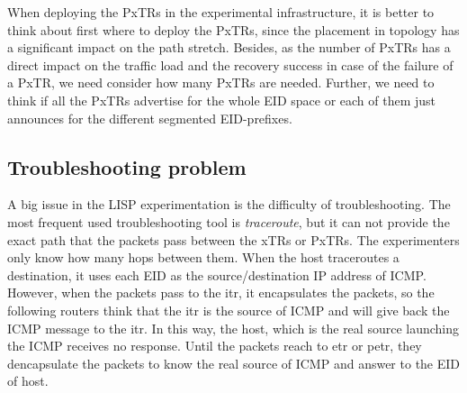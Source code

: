 When deploying the PxTRs in the experimental infrastructure, it is better to think about first where to deploy the PxTRs, since the placement in topology has a significant impact on the path stretch. Besides, as the number of PxTRs has a direct impact on the traffic load and the recovery success in case of the failure of a PxTR, we need consider how many PxTRs are needed. Further, we need to think if all the PxTRs advertise for the whole EID space or each of them just announces for the different segmented EID-prefixes.

\subsection{Troubleshooting problem}
\label{subsubsec:impact_troubleshooting}
A big issue in the LISP experimentation is the difficulty of troubleshooting. The most frequent used troubleshooting tool is \emph{traceroute}, but it can not provide the exact path that the packets pass between the xTRs or PxTRs. The experimenters only know how many hops between them. When the host traceroutes a destination, it uses each EID as the source/destination IP address of ICMP. However, when the packets pass to the \acrshort{itr}, it encapsulates the packets, so the following routers think that the \acrshort{itr} is the source of ICMP and will give back the ICMP message to the \acrshort{itr}. In this way, the host, which is the real source launching the ICMP receives no response. Until the packets reach to \acrshort{etr} or \acrshort{petr}, they dencapsulate the packets to know the real source of ICMP and answer to the EID of host.

